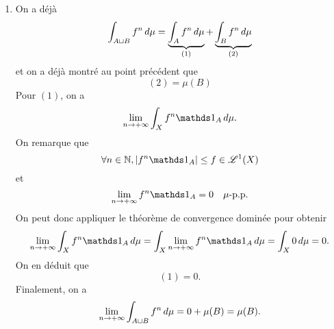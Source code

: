 {\begin{td-sol}[]
\begin{enumerate}
            \item On a déjà
            \begin{equation*}
                \int_{A\sqcup B}f^n\mathop{}\!{d}\mu = \underbrace{\int_{A}f^n\mathop{}\!{d}\mu}_{(1)} + \underbrace{\int_{B}f^n\mathop{}\!{d}\mu}_{(2)}
            \end{equation*}
            et on a déjà montré au point précédent que
            \begin{equation*}
                (2) = \mu(B)
            \end{equation*}
            Pour \((1)\), on a
            \begin{equation*}
                \lim_{n\to+\infty}\int_{X}f^n\one_A\der\mu.
            \end{equation*}
            On remarque que 
            \begin{equation*}
                \forall n\in\N, \n{f^n\one_A}\leq f\in\scr L^1(X)
            \end{equation*}
            et 
            \begin{equation*}
                \lim_{n\to+\infty}f^n\one_A = 0\quad \mu\text{-p.p.}
            \end{equation*}
            On peut donc appliquer le théorème de convergence dominée pour obtenir
            \begin{equation*}
                \lim_{n\to+\infty}\int_{X}f^n\one_A\der\mu = \int_{X}\lim_{n\to+\infty}f^n\one_A\der\mu = \int_{X}0\der\mu = 0.
            \end{equation*}
            On en déduit que
            \begin{equation*}
                (1) = 0.
            \end{equation*}
            Finalement, on a
            \begin{equation*}
                \lim_{n\to+\infty}\int_{A\sqcup B}f^n\mathop{}\!{d}\mu = 0 + \mu(B) = \mu(B).
            \end{equation*}
        \end{enumerate}
    \end{td-sol}
}{}

